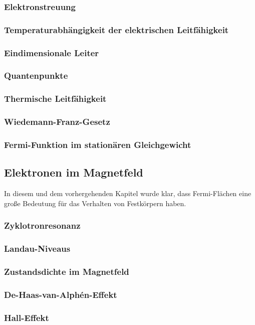 \documentclass[a4paper,12pt]{article}
\begin{document}
\subsubsection{Elektronstreuung}
\subsubsection{Temperaturabhängigkeit der elektrischen Leitfähigkeit}
\subsubsection{Eindimensionale Leiter}
\subsubsection{Quantenpunkte}
\subsubsection{Thermische Leitfähigkeit}
\subsubsection{Wiedemann-Franz-Gesetz}
\subsubsection{Fermi-Funktion im stationären Gleichgewicht}
\subsection{Elektronen im Magnetfeld}
In diesem und dem vorhergehenden Kapitel wurde klar, dass Fermi-Flächen eine große Bedeutung für das Verhalten von Festkörpern haben.
\subsubsection{Zyklotronresonanz}
\subsubsection{Landau-Niveaus}
\subsubsection{Zustandsdichte im Magnetfeld}
\subsubsection{De-Haas-van-Alphén-Effekt}
\subsubsection{Hall-Effekt}
\end{document}
